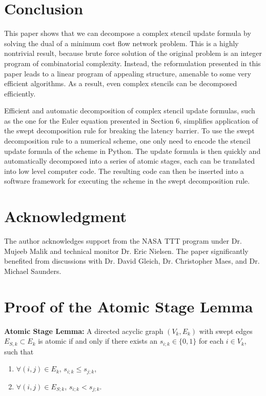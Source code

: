 \documentclass[review]{siamart0216}
\begin{document}
\section{Conclusion}

This paper shows that we can decompose a complex stencil update
formula by solving the dual of a minimum cost flow network problem.
This is a highly nontrivial result, because brute force solution of
the original problem is an integer program of combinatorial complexity.
Instead, the reformulation presented in this paper leads to a
linear program of appealing structure, amenable to some very efficient
algorithms.  As a result, even complex stencils can be decomposed
efficiently.

Efficient and automatic decomposition of complex stencil update formulas,
such as the one for the Euler equation presented in Section 6, simplifies
application of the swept decomposition rule \cite{} for breaking the latency
barrier.  To use the swept decomposition rule to a numerical scheme, one
only need to encode the stencil update formula of the scheme in Python.
The update formula is then quickly and automatically decomposed into a series
of atomic stages, each can be translated into low level computer code.
The resulting code can then be inserted into a software framework for executing
the scheme in the swept decomposition rule.

\section*{Acknowledgment}

The author acknowledges support from the NASA TTT program under
Dr. Mujeeb Malik and technical monitor Dr. Eric Nielsen.  The
paper significantly benefited from discussions with Dr. David Gleich,
Dr. Christopher Maes, and Dr. Michael Saunders.


\appendix

\section{Proof of the Atomic Stage Lemma}

{\bf Atomic Stage Lemma:} 
A directed acyclic graph $(V_k, E_k)$ with swept edges $E_{S,k}\subset E_k$
is atomic if and only if there exists an $s_{i;k} \in \{0,1\}$ for each
$i\in V_k$,
such that
\begin{enumerate}
    \item $\forall (i,j)\in E_k$, $s_{i;k} \le s_{j;k}$,
    \item $\forall (i,j)\in E_{S;k}$, $s_{i;k} < s_{j;k}$.
\end{enumerate}
\end{document}
